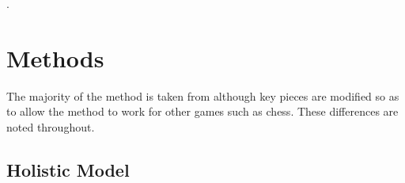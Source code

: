 \documentclass[english]{article}
\begin{document}
\cite{eight, nine, ten}.

\section{Methods}

The majority of the method is taken from \cite{AlphaGoZero} although key pieces
are modified so as to allow the method to work for other games such as chess.
These differences are noted throughout.

\subsection{Holistic Model}
\end{document}
